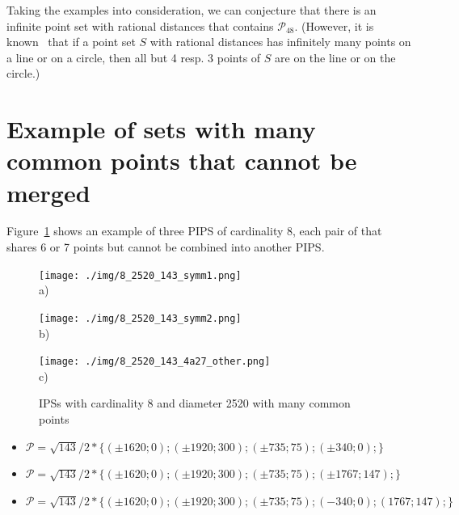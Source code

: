 \documentclass[12pt]{article}
\theoremstyle{theorem}
\theoremstyle{dfn}
\theoremstyle{remark}
\begin{document}
Taking the examples into consideration,
we can conjecture that there is an infinite point set with rational distances
that contains $\mathcal{P}_{48}$.
(However, it is known~\cite{solymosi2010question} that
if a point set $S$ with rational distances has infinitely many points on a line or on a circle,
then all but 4 resp. 3 points of $S$ are on the line or on the circle.)


\section{Example of sets with many common points that cannot be merged}

Figure~\ref{8_with_many_common} shows an example of three PIPS of cardinality 8,
each pair of that shares 6 or 7 points but cannot be combined into another PIPS.

\begin{figure}[h!]
	\begin{minipage}[h]{0.32\linewidth}
		\begin{center}
			\texttt{[image: ./img/8\_2520\_143\_symm1.png]}\\ a)
		\end{center}
	\end{minipage}
	\hfill
	\begin{minipage}[h]{0.32\linewidth}
		\begin{center}
			\texttt{[image: ./img/8\_2520\_143\_symm2.png]}\\ b)
		\end{center}
	\end{minipage}
	\begin{minipage}[h]{0.32\linewidth}
		\begin{center}
			\texttt{[image: ./img/8\_2520\_143\_4a27\_other.png]}\\ c)
		\end{center}
	\end{minipage}
	\hfill
	\caption{IPSs with cardinality 8 and diameter 2520 with many common points}
	\label{8_with_many_common}
\end{figure}

\begin{itemize}
\item
$\mathcal{P}=\sqrt{143}/2*\{
( \pm1620 ; 0);
( \pm1920 ; 300);
( \pm735 ; 75);
( \pm340 ; 0);
\}$

\item
$\mathcal{P}=\sqrt{143}/2*\{
( \pm1620 ; 0);
( \pm1920 ; 300);
( \pm735 ; 75);
( \pm1767 ; 147);
\}$

\item
$\mathcal{P}=
\sqrt{143}/2*\{
( \pm1620 ; 0);
( \pm1920 ; 300);
( \pm735 ; 75);
( -340 ; 0);
( 1767 ; 147);
\}$

\end{itemize}
\end{document}
